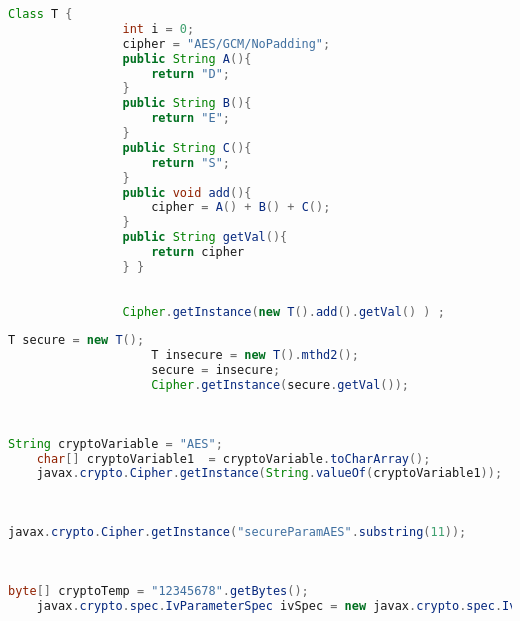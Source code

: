             \begin{lstlisting}[frame=tb,caption={\small Method Builder}, label={lst:methodbuilder},language=java]
                Class T {
                int i = 0;
                cipher = "AES/GCM/NoPadding";
                public String A(){
                    return "D";
                }
                public String B(){
                    return "E";
                }
                public String C(){
                    return "S";
                }
                public void add(){
                    cipher = A() + B() + C();
                }
                public String getVal(){
                    return cipher
                } }
        
        
                Cipher.getInstance(new T().add().getVal() ) ;
                \end{lstlisting}
                \vspace{-0.25em}
            

                \begin{lstlisting}[frame=tb,caption={\small Object Sensitive, using the object created in Listing A.1}, label={lst:ObjectSensitivity},language=java]
                    T secure = new T();
                    T insecure = new T().mthd2();
                    secure = insecure;
                    Cipher.getInstance(secure.getVal());
                    
                        
                    \end{lstlisting}
                    \vspace{-0.25em}

\begin{lstlisting}[frame=tb,caption={\small Build Variable}, label={lst:buildvariable},language=java]
    String cryptoVariable = "AES";
    char[] cryptoVariable1  = cryptoVariable.toCharArray();
    javax.crypto.Cipher.getInstance(String.valueOf(cryptoVariable1));
                        
                            
\end{lstlisting}
\vspace{-0.25em}

\begin{lstlisting}[frame=tb,caption={\small Substring}, label={lst:substring},language=java]
    javax.crypto.Cipher.getInstance("secureParamAES".substring(11));
                        
                            
\end{lstlisting}
\vspace{-0.25em}

\begin{lstlisting}[frame=tb,caption={\small Static Keystore}, label={lst:statickeystore},language=java]
    byte[] cryptoTemp = "12345678".getBytes();
    javax.crypto.spec.IvParameterSpec ivSpec = new javax.crypto.spec.IvParameterSpec.getInstance(cryptoTemp,"AES");
                        
                            
\end{lstlisting}
\vspace{-0.25em}
        


